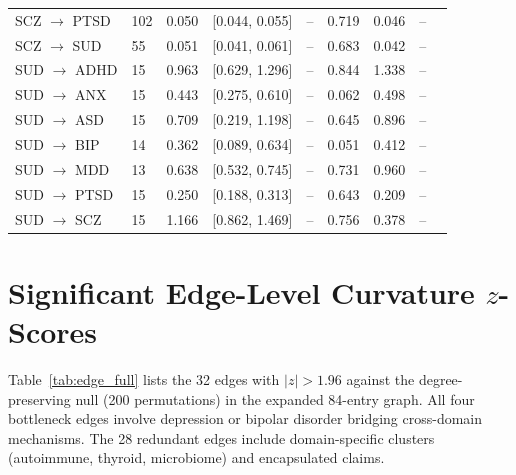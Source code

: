 \documentclass[11pt]{article}
\begin{document}
\begin{table}[h]
\begin{tabular}{llccccccc}
SCZ $\to$ PTSD & 102 & 0.050 & [0.044, 0.055] & -- & 0.719 & 0.046 & -- \\
SCZ $\to$ SUD & 55 & 0.051 & [0.041, 0.061] & -- & 0.683 & 0.042 & -- \\
\midrule
SUD $\to$ ADHD & 15 & 0.963 & [0.629, 1.296] & -- & 0.844 & 1.338 & -- \\
SUD $\to$ ANX & 15 & 0.443 & [0.275, 0.610] & -- & 0.062 & 0.498 & -- \\
SUD $\to$ ASD & 15 & 0.709 & [0.219, 1.198] & -- & 0.645 & 0.896 & -- \\
SUD $\to$ BIP & 14 & 0.362 & [0.089, 0.634] & -- & 0.051 & 0.412 & -- \\
SUD $\to$ MDD & 13 & 0.638 & [0.532, 0.745] & -- & 0.731 & 0.960 & -- \\
SUD $\to$ PTSD & 15 & 0.250 & [0.188, 0.313] & -- & 0.643 & 0.209 & -- \\
SUD $\to$ SCZ & 15 & 1.166 & [0.862, 1.469] & -- & 0.756 & 0.378 & -- \\
\bottomrule
\end{tabular}
\end{table}

\section{Significant Edge-Level Curvature $z$-Scores}
\label{app:edges}

Table~\ref{tab:edge_full} lists the 32 edges with $|z| > 1.96$ against the degree-preserving null (200 permutations) in the expanded 84-entry graph. All four bottleneck edges involve depression or bipolar disorder bridging cross-domain mechanisms. The 28 redundant edges include domain-specific clusters (autoimmune, thyroid, microbiome) and encapsulated claims.
\end{document}
